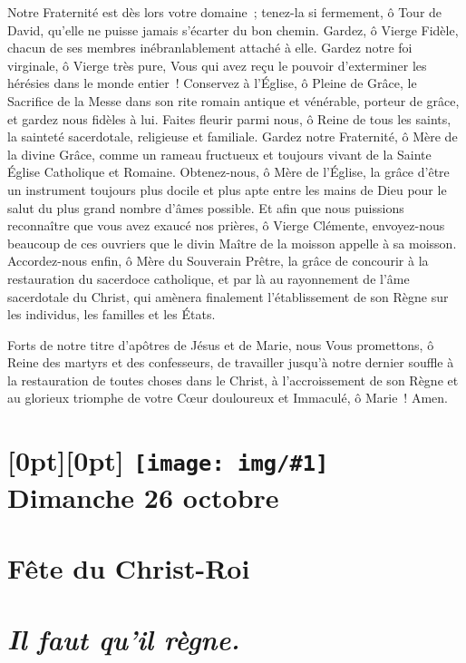 \documentclass[%
a5paper%
,11pt%
,DIV=15%
,titlepage=on%
,headings=optiontoheadandtoc%
,headings=small%
,parskip=false%
,titlepage%
,openany%
]{scrbook}
\newcommand{\bgimage}[1]{%
\raisebox{-.45\paperheight}[0pt][0pt]{%
  \transparent{0.3}%
  \texttt{[image: img/\#1]}%
  }%
}
\begin{document}
\begin{multicols}{2}
Notre Fraternité est dès lors votre domaine ; tenez-la si fermement, ô Tour de David, qu’elle ne puisse jamais s’écarter du bon chemin. Gardez, ô Vierge Fidèle, chacun de ses membres inébranlablement attaché à elle. Gardez notre foi virginale, ô Vierge très pure, Vous qui avez reçu le pouvoir d’exterminer les hérésies dans le monde entier ! Conservez à l’Église, ô Pleine de Grâce, le Sacrifice de la Messe dans son rite romain antique et vénérable, porteur de grâce, et gardez nous fidèles à lui. Faites fleurir parmi nous, ô Reine de tous les saints, la sainteté sacerdotale, religieuse et familiale. Gardez notre Fraternité, ô Mère de la divine Grâce, comme un rameau fructueux et toujours vivant de la Sainte Église Catholique et Romaine. Obtenez-nous, ô Mère de l’Église, la grâce d’être un instrument toujours plus docile et plus apte entre les mains de Dieu pour le salut du plus grand nombre d’âmes possible. Et afin que nous puissions reconnaître que vous avez exaucé nos prières, ô Vierge Clémente, envoyez-nous beaucoup de ces ouvriers que le divin Maître de la moisson appelle à sa moisson. Accordez-nous enfin, ô Mère du Souverain Prêtre, la grâce de concourir à la restauration du sacerdoce catholique, et par là au rayonnement de l’âme sacerdotale du Christ, qui amènera finalement l’établissement de son Règne sur les individus, les familles et les États.

Forts de notre titre d’apôtres de Jésus et de Marie, nous Vous promettons, ô Reine des martyrs et des confesseurs, de travailler jusqu’à notre dernier souffle à la restauration de toutes choses dans le Christ, à l’accroissement de son Règne et au glorieux triomphe de votre Cœur douloureux et Immaculé, ô Marie ! Amen.
\end{multicols}




\part[Dimanche 26 octobre]{%
\bgimage{ChristRoi}\\
Dimanche 26 octobre\\\ \\ {\large Fête du Christ-Roi\\\ \\ \emph{Il faut qu'il règne.}}}
\end{document}
